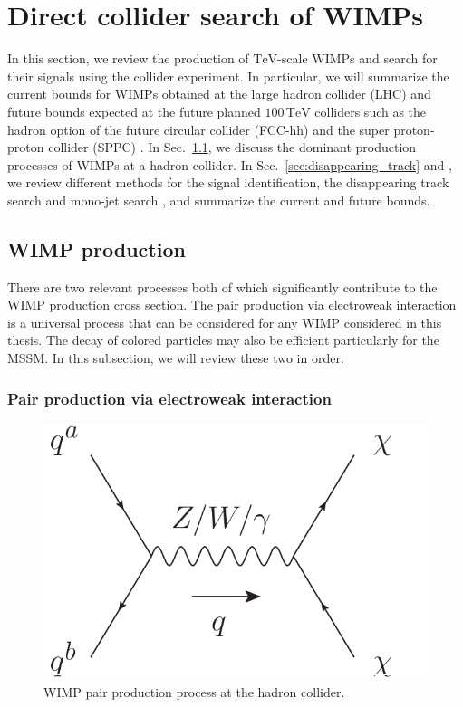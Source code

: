 \documentclass[12pt,twoside,book]{article}
\begin{document}
\section{Direct collider search of WIMPs}
\setcounter{equation}{0}

\vskip 0.1in

In this section, we review the production of $\mathrm{TeV}$-scale WIMPs and search for their signals using the collider experiment.
In particular, we will summarize the current bounds for WIMPs obtained at the large hadron collider (LHC) and future bounds expected at the future planned $100\,\mathrm{TeV}$ colliders such as the hadron option of the future circular collider (FCC-hh) \cite{Benedikt:2651300} and the super proton-proton collider (SPPC) \cite{CEPC-SPPCStudyGroup:2015csa, CEPC-SPPCStudyGroup:2015esa}.
In Sec.~\ref{sec:wimp_production}, we discuss the dominant production processes of WIMPs at a hadron collider.
In Sec.~\ref{sec:disappearing_track} and , we review  different methods for the signal identification, the disappearing track search and mono-jet search , and summarize the current and future bounds.


\subsection{WIMP production}
\label{sec:wimp_production}

There are two relevant processes both of which significantly contribute to the WIMP production cross section.
The pair production via electroweak interaction is a universal process that can be considered for any WIMP considered in this thesis.
The decay of colored particles may also be efficient particularly for the MSSM.
In this subsection, we will review these two in order.


\subsubsection*{Pair production via electroweak interaction}

\begin{figure}[b]
  \centering
  \includegraphics[width=0.4\hsize]{WIMP_production.pdf}
  \caption{WIMP pair production process at the hadron collider.}
  \label{fig:wimp_production}
\end{figure}
\end{document}
